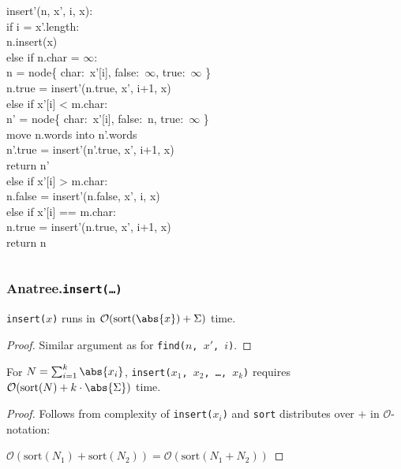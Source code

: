 \documentclass[english, aspectratio=169]{beamer}
\newcommand{\sort}[1]{\text{sort}(#1)}
\newcommand{\Oh}[1]{\ensuremath{\mathcal{O}(#1)}}
\begin{document}
\begin{frame}
\begin{columns}
\begin{column}{0.52\textwidth}
      insert'(n, x', i, x):\\
       {{
        \quad if i = x'.length:\\
        \qquad n.insert(x)\\
      }}
       {{
        \quad else if n.char = $\infty$:\\
        \qquad n = node\{ char:\ x'[i], false:\ $\infty$, true:\ $\infty$ \}\\
        \qquad n.true = insert'(n.true, x', i+1, x)\\
      }}
       {{
        \quad else if x'[i] < m.char:\\
        \qquad n' = node\{ char:\ x'[i], false:\ n, true:\ $\infty$ \}\\
        \qquad move n.words into n'.words\\
        \qquad n'.true = insert'(n'.true, x', i+1, x)\\
        \qquad return n'\\
      }}
       {{
      \quad else if x'[i] > m.char:\\
      \qquad n.false = insert'(n.false, x', i, x)\\
      }}
       {{
        \quad else if x'[i] == m.char:\\
        \qquad n.true = insert'(n.true, x', i+1, x)\\
      }}
       {{
        \quad return n\\
      }}
    \end{column}
  \end{columns}
\end{frame}

\begin{frame}
  \frametitle{Anatree.\texttt{insert(\dots)}}

  \begin{theorem}
    \texttt{insert($x$)} runs in $\Oh{\sort{\abs{x}} + \Sigma}$ time.
  \end{theorem}
  \begin{proof}
    Similar argument as for \texttt{find($n$, $x'$, $i$)}.
  \end{proof}

  \pause

  \begin{corollary}
    For $N = \sum_{i = 1}^k \abs{x_i}$, \texttt{insert($x_1$, $x_2$, \dots, $x_k$)} requires
    $\Oh{\sort{N} + k \cdot \abs{\Sigma}}$ time.
  \end{corollary}
  \begin{proof}
    Follows from complexity of \texttt{insert($x_i$)} and \texttt{sort} distributes over $+$ in
    $\mathcal{O}$-notation:

    \qquad $\Oh{\sort{N_1} + \sort{N_2}} = \Oh{\sort{N_1 + N_2}}$
  \end{proof}
\end{frame}
\end{document}
